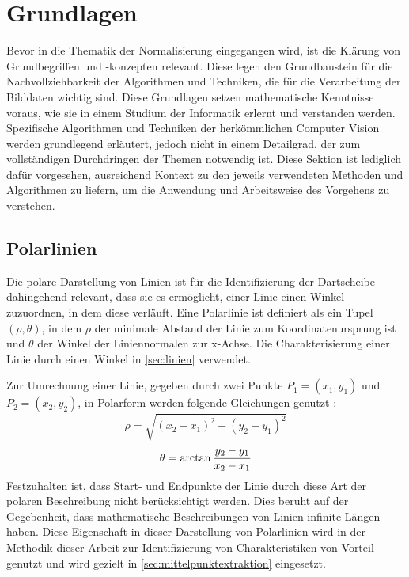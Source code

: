 
\section{Grundlagen}
\label{sec:cv:grundlagen}

Bevor in die Thematik der Normalisierung eingegangen wird, ist die Klärung von Grundbegriffen und -konzepten relevant. Diese legen den Grundbaustein für die Nachvollziehbarkeit der Algorithmen und Techniken, die für die Verarbeitung der Bilddaten wichtig sind. Diese Grundlagen setzen mathematische Kenntnisse voraus, wie sie in einem Studium der Informatik erlernt und verstanden werden. Spezifische Algorithmen und Techniken der herkömmlichen Computer Vision werden grundlegend erläutert, jedoch nicht in einem Detailgrad, der zum vollständigen Durchdringen der Themen notwendig ist. Diese Sektion ist lediglich dafür vorgesehen, ausreichend Kontext zu den jeweils verwendeten Methoden und Algorithmen zu liefern, um die Anwendung und Arbeitsweise des Vorgehens zu verstehen.


\subsection{Polarlinien}
\label{sec:polarlinien}

Die polare Darstellung von Linien ist für die Identifizierung der Dartscheibe dahingehend relevant, dass sie es ermöglicht, einer Linie einen Winkel zuzuordnen, in dem diese verläuft. Eine Polarlinie ist definiert als ein Tupel $(\rho, \theta)$, in dem $\rho$ der minimale Abstand der Linie zum Koordinatenursprung ist und $\theta$ der Winkel der Liniennormalen zur x-Achse. Die Charakterisierung einer Linie durch einen Winkel in \autoref{sec:linien} verwendet.

Zur Umrechnung einer Linie, gegeben durch zwei Punkte $P_1 = (x_1, y_1)$ und $P_2 = (x_2, y_2)$, in Polarform werden folgende Gleichungen genutzt \cite{polar_linien}:
\[ \rho = \sqrt{(x_2 - x_1)^2 + (y_2 - y_1)^2} \]
\[ \theta = \operatorname{arctan} \frac{y_2 - y_1}{x_2 - x_1} \]
Festzuhalten ist, dass Start- und Endpunkte der Linie durch diese Art der polaren Beschreibung nicht berücksichtigt werden. Dies beruht auf der Gegebenheit, dass mathematische Beschreibungen von Linien infinite Längen haben. Diese Eigenschaft in dieser Darstellung von Polarlinien wird in der Methodik dieser Arbeit zur Identifizierung von Charakteristiken von Vorteil genutzt und wird gezielt in \autoref{sec:mittelpunktextraktion} eingesetzt.

